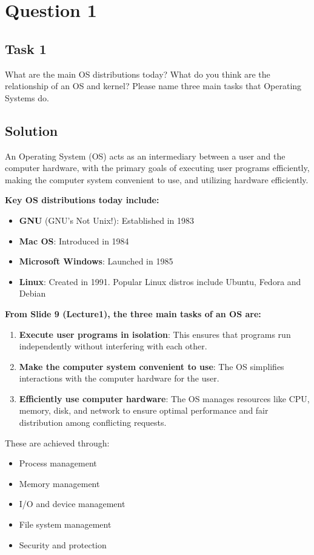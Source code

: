 \documentclass[../main.tex]{subfiles}
\begin{document}
\section{Question 1}

\subsection{Task 1}

What are the main OS distributions today? What do you think are the relationship of an OS and kernel? Please name three main tasks that Operating Systems do.

\subsection*{Solution}

An Operating System (OS) acts as an intermediary between a user and the computer hardware, with the primary goals of executing user programs efficiently, making the computer system convenient to use, and utilizing hardware efficiently.

\textbf{Key OS distributions today include:}
\begin{itemize}
    \item \textbf{GNU} (GNU's Not Unix!): Established in 1983
    \item \textbf{Mac OS}: Introduced in 1984
    \item \textbf{Microsoft Windows}: Launched in 1985
    \item \textbf{Linux}: Created in 1991. Popular Linux distros include Ubuntu, Fedora and Debian
\end{itemize}

\textbf{From Slide 9 (Lecture1), the three main tasks of an OS are:}
\begin{enumerate}
    \item \textbf{Execute user programs in isolation}: This ensures that programs run independently without interfering with each other.
    \item \textbf{Make the computer system convenient to use}: The OS simplifies interactions with the computer hardware for the user.
    \item \textbf{Efficiently use computer hardware}: The OS manages resources like CPU, memory, disk, and network to ensure optimal performance and fair distribution among conflicting requests.
\end{enumerate}

These are achieved through:
\begin{itemize}
    \item Process management
    \item Memory management
    \item I/O and device management
    \item File system management
    \item Security and protection
\end{itemize}
\end{document}
